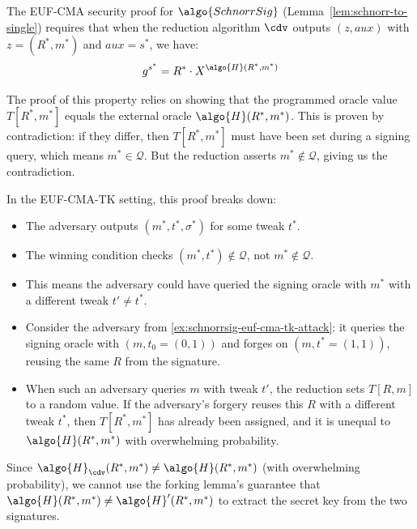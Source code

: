 \ifsolutions
\begin{mysolution}
  The EUF-CMA security proof for $\algo{SchnorrSig}$ (Lemma~\ref{lem:schnorr-to-single}) requires that when the reduction algorithm $\cdv$ outputs $(z, \mathit{aux})$ with $z = (R^*, m^*)$ and $\mathit{aux} = s^*$, we have:
  \[
    g^{s^*} = R^* \cdot X^{\algo{H}(R^*, m^*)}
  \]
  
  The proof of this property relies on showing that the programmed oracle value $T[R^*, m^*]$ equals the external oracle $\algo{H}(R^*, m^*)$.
  This is proven by contradiction: if they differ, then $T[R^*, m^*]$ must have been set during a signing query, which means $m^* \in \mathcal{Q}$.
  But the reduction asserts $m^* \notin \mathcal{Q}$, giving us the contradiction.
  
  In the EUF-CMA-TK setting, this proof breaks down:
  \begin{itemize}
    \item The adversary outputs $(m^*, t^*, \sigma^*)$ for some tweak $t^*$.
    \item The winning condition checks $(m^*, t^*) \notin \mathcal{Q}$, not $m^* \notin \mathcal{Q}$.
    \item This means the adversary could have queried the signing oracle with $m^*$ with a different tweak $t' \neq t^*$.
    \item Consider the adversary from \autoref{ex:schnorrsig-euf-cma-tk-attack}: it queries the signing oracle with $(m, t_0 = (0,1))$ and forges on $(m, t^* = (1,1))$, reusing the same $R$ from the signature.
    \item When such an adversary queries $m$ with tweak $t'$, the reduction sets $T[R, m]$ to a random value. If the adversary's forgery reuses this $R$ with a different tweak $t^*$, then $T[R^*, m^*]$ has already been assigned, and it is unequal to $\algo{H}(R^*, m^*)$ with overwhelming probability.
  \end{itemize}
  
  Since $\algo{H}_{\cdv}(R^*, m^*) \neq \algo{H}(R^*, m^*)$ (with overwhelming probability), we cannot use the forking lemma's guarantee that $\algo{H}(R^*, m^*) \neq \algo{H}'(R^*, m^*)$ to extract the secret key from the two signatures.
\end{mysolution}
\fi

